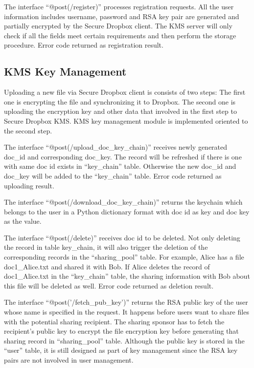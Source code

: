 The interface ``@post(/register)'' processes registration requests. All the user information includes username, password and RSA key pair are generated and partially encrypted by the Secure Dropbox client. The KMS server will only check if all the fields meet certain requirements and then perform the storage procedure. Error code returned as registration result.

\subsection{KMS Key Management}

Uploading a new file via Secure Dropbox client is consists of two steps: The first one is encrypting the file and synchronizing it to Dropbox. The second one is uploading the encryption key and other data that involved in the first step to Secure Dropbox KMS. KMS key management module is implemented oriented to the second step.

The interface ``@post(/upload\_doc\_key\_chain)'' receives newly generated doc\_id and corresponding doc\_key. The record will be refreshed if there is one with same doc id exists in ``key\_chain'' table. Otherwise the new doc\_id and doc\_key will be added to the ``key\_chain'' table. Error code returned as uploading result.

The interface ``@post(/download\_doc\_key\_chain)'' returns the keychain which belongs to the user in a Python dictionary format with doc id as key and doc key as the value.

The interface ``@post(/delete)'' receives doc id to be deleted. Not only deleting the record in table key\_chain, it will also trigger the deletion of the corresponding records in the ``sharing\_pool'' table. For example, Alice has a file doc1\_Alice.txt and shared it with Bob. If Alice deletes the record of doc1\_Alice.txt in the ``key\_chain'' table, the sharing information with Bob about this file will be deleted as well. Error code returned as deletion result.

The interface ``@post('/fetch\_pub\_key')'' returns the RSA public key of the user whose name is specified in the request. It happens before users want to share files with the potential sharing recipient. The sharing sponsor has to fetch the recipient’s public key to encrypt the file encryption key before generating that sharing record in ``sharing\_pool'' table. Although the public key is stored in the ``user'' table, it is still designed as part of key management since the RSA key pairs are not involved in user management.

